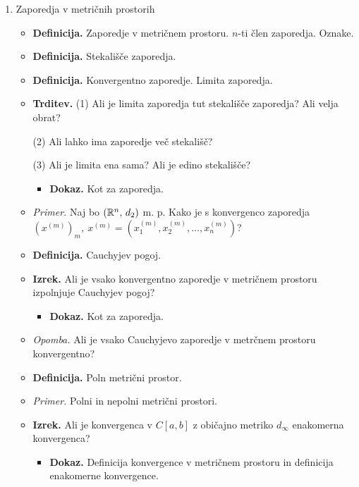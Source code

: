 \begin{enumerate}
    \item Zaporedja v metričnih prostorih
    \begin{itemize}
        \item \colorbox{purple!30}{\textbf{Definicija.}} Zaporedje v metričnem prostoru. $n$-ti člen zaporedja. Oznake.
        \item \colorbox{purple!30}{\textbf{Definicija.}} Stekališče zaporedja.
        \item \colorbox{purple!30}{\textbf{Definicija.}} Konvergentno zaporedje. Limita zaporedja.
        \item \colorbox{blue!30}{\textbf{Trditev.}} (1) Ali je limita zaporedja tut stekališče zaporedja? Ali velja obrat?
        
        (2) Ali lahko ima zaporedje več stekališč?

        (3) Ali je limita ena sama? Ali je edino stekališče?
        \begin{itemize}
            \item \colorbox{green!30}{\textbf{Dokaz.}} Kot za zaporedja.
        \end{itemize}
        \item \colorbox{yellow!30}{\emph{Primer.}} Naj bo $(\mathbb{R}^n, \, d_2)$ m. p. Kako je s konvergenco zaporedja $(x^{(m)})_m, \ x^{(m)} = (x_1^{(m)}, x_2^{(m)}, \ldots, x_n^{(m)})$?
        \item \colorbox{purple!30}{\textbf{Definicija.}} Cauchyjev pogoj.
        \item \colorbox{blue!30}{\textbf{Izrek.}} Ali je vsako konvergentno zaporedje v metričnem prostoru izpolnjuje Cauchyjev pogoj?
        \begin{itemize}
            \item \colorbox{green!30}{\textbf{Dokaz.}} Kot za zaporedja.
        \end{itemize}
        \item \colorbox{yellow!30}{\emph{Opomba.}} Ali je vsako Cauchyjevo zaporedje v metrčnem prostoru konvergentno?
        \item \colorbox{purple!30}{\textbf{Definicija.}} Poln metrični prostor.
        \item \colorbox{yellow!30}{\emph{Primer.}} Polni in nepolni metrični prostori.
        \item \colorbox{blue!30}{\textbf{Izrek.}} Ali je konvergenca v $C[a,b]$ z običajno metriko $d_\infty$ enakomerna konvergenca?
        \begin{itemize}
            \item \colorbox{green!30}{\textbf{Dokaz.}} Definicija konvergence v metričnem prostoru in definicija enakomerne konvergence.

\end{itemize}
\end{itemize}
\end{enumerate}
